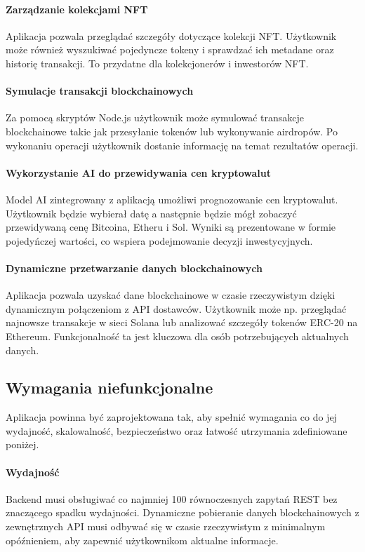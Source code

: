 \paragraph{Zarządzanie kolekcjami NFT}
Aplikacja pozwala przeglądać szczegóły dotyczące kolekcji NFT. Użytkownik może również wyszukiwać pojedyncze tokeny i sprawdzać ich metadane oraz historię transakcji. To przydatne dla kolekcjonerów i inwestorów NFT.

\paragraph{Symulacje transakcji blockchainowych}
Za pomocą skryptów Node.js użytkownik może symulować transakcje blockchainowe takie jak przesyłanie tokenów lub wykonywanie airdropów. Po wykonaniu operacji użytkownik dostanie informację na temat rezultatów operacji.

\paragraph{Wykorzystanie AI do przewidywania cen kryptowalut}
Model AI zintegrowany z aplikacją umożliwi prognozowanie cen kryptowalut. Użytkownik będzie wybierał datę a następnie będzie mógł zobaczyć przewidywaną cenę Bitcoina, Etheru i Sol. Wyniki są prezentowane w formie pojedyńczej wartości, co wspiera podejmowanie decyzji inwestycyjnych.

\paragraph{Dynamiczne przetwarzanie danych blockchainowych}
Aplikacja pozwala uzyskać dane blockchainowe w czasie rzeczywistym dzięki dynamicznym połączeniom z API dostawców. Użytkownik może np. przeglądać najnowsze transakcje w sieci Solana lub analizować szczegóły tokenów ERC-20 na Ethereum. Funkcjonalność ta jest kluczowa dla osób potrzebujących aktualnych danych.

\subsection{Wymagania niefunkcjonalne}
Aplikacja powinna być zaprojektowana tak, aby spełnić wymagania co do jej wydajność, skalowalność, bezpieczeństwo oraz łatwość utrzymania zdefiniowane poniżej.

\paragraph{Wydajność}
Backend musi obsługiwać co najmniej 100 równoczesnych zapytań REST bez znaczącego spadku wydajności. Dynamiczne pobieranie danych blockchainowych z zewnętrznych API musi odbywać się w czasie rzeczywistym z minimalnym opóźnieniem, aby zapewnić użytkownikom aktualne informacje.


